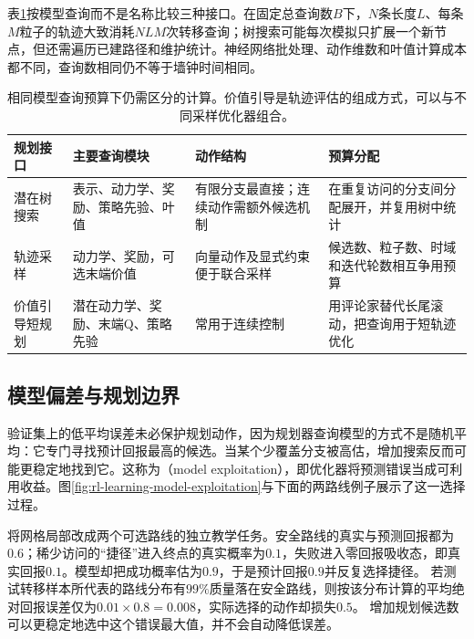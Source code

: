 表\ref{tab:rl-learning-planning-budgets}按模型查询而不是名称比较三种接口。在固定总查询数$B$下，$N$条长度$L$、每条$M$粒子的轨迹大致消耗$NLM$次转移查询；树搜索可能每次模拟只扩展一个新节点，但还需遍历已建路径和维护统计。神经网络批处理、动作维数和叶值计算成本都不同，查询数相同仍不等于墙钟时间相同。

\begin{table}[t]
  \centering
  \small
  \begin{tabularx}{\linewidth}{>{\raggedright\arraybackslash}p{23mm} >{\raggedright\arraybackslash}X >{\raggedright\arraybackslash}X >{\raggedright\arraybackslash}X}
    \toprule
    规划接口 & 主要查询模块 & 动作结构 & 预算分配 \\
    \midrule
    潜在树搜索 & 表示、动力学、奖励、策略先验、叶值 & 有限分支最直接；连续动作需额外候选机制 & 在重复访问的分支间分配展开，并复用树中统计 \\
    轨迹采样 & 动力学、奖励，可选末端价值 & 向量动作及显式约束便于联合采样 & 候选数、粒子数、时域和迭代轮数相互争用预算 \\
    价值引导短规划 & 潜在动力学、奖励、末端Q、策略先验 & 常用于连续控制 & 用评论家替代长尾滚动，把查询用于短轨迹优化 \\
    \bottomrule
  \end{tabularx}
  \caption{相同模型查询预算下仍需区分的计算。价值引导是轨迹评估的组成方式，可以与不同采样优化器组合。}
  \label{tab:rl-learning-planning-budgets}
\end{table}

\subsection{模型偏差与规划边界}
\label{sec:rl-learning-model-bias}

验证集上的低平均误差未必保护规划动作，因为规划器查询模型的方式不是随机平均：它专门寻找预计回报最高的候选。当某个少覆盖分支被高估，增加搜索反而可能更稳定地找到它。这称为（model exploitation），即优化器将预测错误当成可利用收益。图\ref{fig:rl-learning-model-exploitation}与下面的两路线例子展示了这一选择过程。

\begin{example}[优化器选择了最乐观的错误]
  \label{ex:rl-learning-model-exploitation}
  将网格局部改成两个可选路线的独立教学任务。安全路线的真实与预测回报都为$0.6$；稀少访问的“捷径”进入终点的真实概率为$0.1$，失败进入零回报吸收态，即真实回报$0.1$。模型却把成功概率估为$0.9$，于是预计回报$0.9$并反复选择捷径。
  若测试转移样本所代表的路线分布有$99\%$质量落在安全路线，则按该分布计算的平均绝对回报误差仅为$0.01\times0.8=0.008$，实际选择的动作却损失$0.5$。
  增加规划候选数可以更稳定地选中这个错误最大值，并不会自动降低误差。
\end{example}

